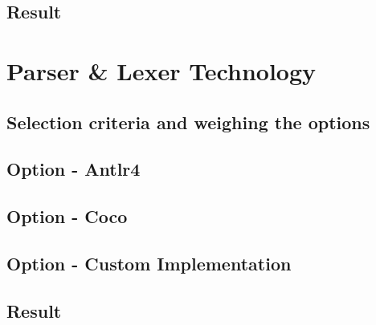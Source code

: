\subsection{Result}



\section{Parser \& Lexer Technology}



\subsection{Selection criteria and weighing the options}



\subsection{Option - Antlr4}



\subsection{Option - Coco}



\subsection{Option - Custom Implementation}


\subsection{Result}

